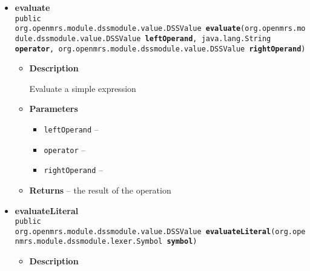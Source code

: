 {{{\begin{itemize}
{\begin{itemize}
{Convert a DSSValue to another Java type. May return null (Java null) if the conversion does not make sense.
}
\item{
{\bf  Parameters}
  \begin{itemize}
   \item{
\texttt{type} -- }
   \item{
\texttt{value} -- }
  \end{itemize}
}%
\item{{\bf  Returns} -- 
 
}%
\end{itemize}
}%
\item{ 
\hypertarget{org.openmrs.module.dssmodule.state.DSSEvaluator.evaluate(org.openmrs.module.dssmodule.value.DSSValue, java.lang.String, org.openmrs.module.dssmodule.value.DSSValue)}{{\bf  evaluate}\\}
\texttt{public org.openmrs.module.dssmodule.value.DSSValue\ {\bf  evaluate}(\texttt{org.openmrs.module.dssmodule.value.DSSValue} {\bf  leftOperand},
\texttt{java.lang.String} {\bf  operator},
\texttt{org.openmrs.module.dssmodule.value.DSSValue} {\bf  rightOperand})
\label{org.openmrs.module.dssmodule.state.DSSEvaluator.evaluate(org.openmrs.module.dssmodule.value.DSSValue, java.lang.String, org.openmrs.module.dssmodule.value.DSSValue)}}%
\begin{itemize}
\item{
{\bf  Description}

Evaluate a simple expression
}
\item{
{\bf  Parameters}
  \begin{itemize}
   \item{
\texttt{leftOperand} -- }
   \item{
\texttt{operator} -- }
   \item{
\texttt{rightOperand} -- }
  \end{itemize}
}%
\item{{\bf  Returns} -- 
the result of the operation 
}%
\end{itemize}
}%
\item{ 
\hypertarget{org.openmrs.module.dssmodule.state.DSSEvaluator.evaluateLiteral(org.openmrs.module.dssmodule.lexer.Symbol)}{{\bf  evaluateLiteral}\\}
\texttt{public org.openmrs.module.dssmodule.value.DSSValue\ {\bf  evaluateLiteral}(\texttt{org.openmrs.module.dssmodule.lexer.Symbol} {\bf  symbol})
\label{org.openmrs.module.dssmodule.state.DSSEvaluator.evaluateLiteral(org.openmrs.module.dssmodule.lexer.Symbol)}}%
\begin{itemize}
\item{
{\bf  Description}

}
\end{itemize}}
\end{itemize}}}}

